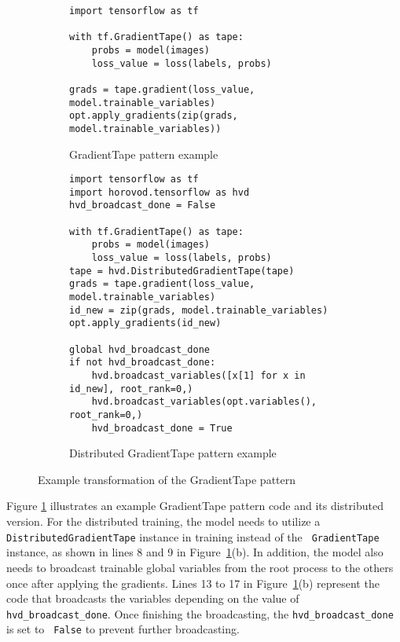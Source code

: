 \begin{figure}[ht!]
  \centering
  \begin{subfigure}[t]{0.8\textwidth}
    \begin{lstlisting}[style=mpython]
import tensorflow as tf

with tf.GradientTape() as tape:
    probs = model(images)
    loss_value = loss(labels, probs)

grads = tape.gradient(loss_value, model.trainable_variables)
opt.apply_gradients(zip(grads, model.trainable_variables))\end{lstlisting}
    \caption{GradientTape pattern example}
  \end{subfigure}
  \hspace{5mm}
  \begin{subfigure}[t]{0.8\textwidth}
    \begin{lstlisting}[style=mpython]
import tensorflow as tf
import horovod.tensorflow as hvd
hvd_broadcast_done = False

with tf.GradientTape() as tape:
    probs = model(images)
    loss_value = loss(labels, probs)
tape = hvd.DistributedGradientTape(tape)
grads = tape.gradient(loss_value, model.trainable_variables)
id_new = zip(grads, model.trainable_variables)
opt.apply_gradients(id_new)

global hvd_broadcast_done
if not hvd_broadcast_done:
    hvd.broadcast_variables([x[1] for x in id_new], root_rank=0,)
    hvd.broadcast_variables(opt.variables(), root_rank=0,)
    hvd_broadcast_done = True\end{lstlisting}
    \caption{Distributed GradientTape pattern example}
  \end{subfigure}
  \caption{Example transformation of the GradientTape pattern}
  \label{fig:trans:gtapetrans}
\end{figure}


Figure \ref{fig:trans:gtapetrans} illustrates an example GradientTape pattern
code and its distributed version.  
For the distributed training, the model needs to utilize a {\tt
DistributedGradientTape} instance in training instead of the {\tt
GradientTape} instance, as shown in lines 8 and 9 in
Figure~\ref{fig:trans:gtapetrans}(b).
In addition, the model also needs to broadcast trainable global variables from
the root process to the others once after applying the gradients.
Lines 13 to 17 in Figure~\ref{fig:trans:gtapetrans}(b) represent the code that
broadcasts the variables depending on the value of {\tt hvd\_broadcast\_done}.
Once finishing the broadcasting, the {\tt hvd\_broadcast\_done} is set to {\tt
False} to prevent further broadcasting.

